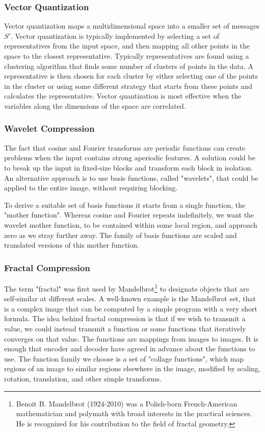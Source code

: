 \documentclass[12pt, a4paper]{report}
\begin{document}
\subsubsection{Vector Quantization}

Vector quantization maps a multidimensional space into a smaller set of messages \(S'\).
Vector quantization is typically implemented by selecting a set of representatives from the input space, and then mapping all
other points in the space to the closest representative.
Typically representatives are found using a clustering algorithm that finds some number of clusters of points in the data.
A representative is then chosen for each cluster by either selecting one of the points in the cluster or using some different
strategy that starts from these points and calculates the representative.
Vector quantization is most effective when the variables along the dimensions of the space are correlated.

\subsubsection{Wavelet Compression}

The fact that cosine and Fourier transforms are periodic functions can create problems when the input contains strong aperiodic
features.
A solution could be to break up the input in fixed-size blocks and transform each block in isolation.
An alternative approach is to use basis functions, called "wavelets", that could be applied to the entire image, without requiring
blocking.

To derive a suitable set of basis functions it starts from a single function, the "mother function".
Whereas cosine and Fourier repeats indefinitely, we want the wavelet mother function, to be contained within some local region,
and approach zero as we stray further away.
The family of basis functions are scaled and translated versions of this mother function.

\subsubsection{Fractal Compression}

The term "fractal" was first used by Mandelbrot\footnote{Benoit B. Mandelbrot (1924-2010) was a Polish-born French-American
mathematician and polymath with broad interests in the practical sciences. He is recognized for his contribution to the field of
fractal geometry.} to designate objects that are self-similar at different scales.
A well-known example is the Mandelbrot set, that is a complex image that can be computed by a simple program with a very short
formula.
The idea behind fractal compression is that if we wish to transmit a value, we could instead transmit a function or some functions
that iteratively converges on that value.
The functions are mappings from images to images.
It is enough that encoder and decoder have agreed in advance about the functions to use.
The function family we choose is a set of "collage functions", which map regions of an image to similar regions elsewhere in the
image, modified by scaling, rotation, translation, and other simple transforms.
\end{document}
